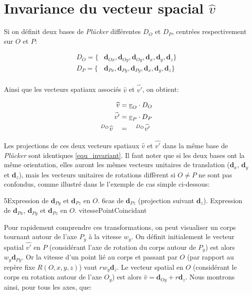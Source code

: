 
\section{Invariance du vecteur spacial $\widehat{v}$}

Si on définit deux bases de \emph{Plücker} différentes $D_{O}$ et $D_{P}$, centrées respectivement sur $O$ et $P$:

\begin{align*}
D_{O} = \lbrace &\textbf{d}_{Ox}, \textbf{d}_{Oy}, \textbf{d}_{Oy}, \textbf{d}_{x}, \textbf{d}_{y}, \textbf{d}_{z} \rbrace \\
D_{P} = \lbrace &\textbf{d}_{Px}, \textbf{d}_{Py}, \textbf{d}_{Py}, \textbf{d}_{x}, \textbf{d}_{y}, \textbf{d}_{z} \rbrace \\
\end{align*}

Ainsi que les vecteurs spatiaux associés $\widehat{v}$ et $\widehat{v'}$, on obtient:

\begin{align}
\widehat{v}  &= \underline{v}_{O} \cdot D_{O} \notag \\
\widehat{v'} &= \underline{v}_{P} \cdot D_{P} \notag \\
^{D_{O}}\widehat{v} \quad &= \quad ^{D_{O}}\widehat{v'}
\label{equ_invariant}
\end{align}


Les projections de ces deux vecteurs spatiaux $\widehat{v}$ et $\widehat{v'}$ dans la même base de \emph{Plücker} sont identiques \eqref{equ_invariant}. Il faut noter que si les deux bases ont la même orientation, elles auront les mêmes vecteurs unitaires de translation ($\textbf{d}_{x}$, $\textbf{d}_{y}$ et $\textbf{d}_{z}$), mais les vecteurs unitaires de rotations diffèrent si $O \neq P$ ne sont pas confondus, comme illustré dans le l'exemple de cas simple ci-dessous:

{5}{Expression de $\textbf{d}_{Py}$ et $\textbf{d}_{Pz}$ en $O$.}
{6}{cas de $\textbf{d}_{Pz}$ (projection suivant $\textbf{d}_{z}$).}
{Expression de $\textbf{d}_{Px}$, $\textbf{d}_{Py}$ et $\textbf{d}_{Pz}$ en $O$.}
{vitessePointCoincidant}


Pour rapidement comprendre ces transformations, on peut visualiser un corps tournant autour de l'axe $P_{y}$ à la vitesse $w_{y}$. On définit initialement le vecteur spatial $\widehat{v'}$ en $P$ (\cad considérant l'axe de rotation du corps autour de $P_{y}$) est alors $w_{y}\textbf{d}_{Py}$. Or la vitesse d'un point lié au corps et passant par $O$ (par rapport au repère fixe $R(O,x,y,z)$) vaut $rw_{y}\textbf{d}_{z}$. Le vecteur spatial en $O$ (\cad considérant le corps en rotation autour de l'axe $O_{y}$) est alors $\widehat{v}=\textbf{d}_{Oy}+r\textbf{d}_{z}$. Nous montrons ainsi, pour tous les axes, que:

